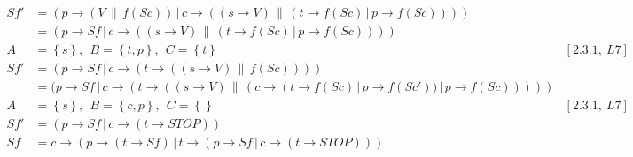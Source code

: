 \documentclass[11pt,a4paper]{article}
\def\ra{\rightarrow}
\def\cc{\,\|\,}
\def\ch{\,|\,}
\newcommand{\sN}[1]{\left \lbrace #1 \right \rbrace}
\begin{document}
\begin{align*}
    Sf'   &= (p \ra (V \cc f(Sc))  \ch c \ra ((s \ra V) \cc
             (t \ra f(Sc) \ch p \ra f(Sc)))) & \\
          &= (p \ra Sf  \ch c \ra ((s \ra V) \cc
             (t \ra f(Sc) \ch p \ra f(Sc)))) & \\
        A &= \sN{s},~~ B = \sN{t,p},~~ C = \sN{t} & [2.3.1,~L7] \\
    Sf'   &= (p \ra Sf  \ch
              c \ra (t \ra ((s \ra V) \cc f(Sc)))) & \\
          &= (p \ra Sf  \ch
              c \ra (t \ra ((s \ra V) \cc
                            (c \ra (t \ra f(Sc) \ch p \ra f(Sc')) \ch p \ra f(Sc))))) & \\
        A &= \sN{s},~~ B = \sN{c,p},~~ C = \sN{ } & [2.3.1,~L7] \\
    Sf'   &= (p \ra Sf \ch c \ra (t \ra STOP)) & \\
    Sf &= c \ra (p \ra (t \ra Sf)
            \ch t \ra  (p \ra Sf \ch c \ra (t \ra STOP))) & \\
\end{align*}
\end{document}
